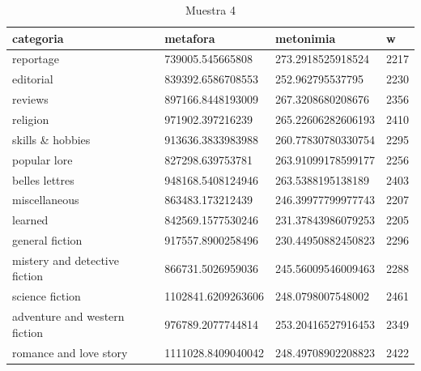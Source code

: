 \documentclass[12pt,letterpaper,twoside]{article}
\begin{document}
\begin{center}
\begin{longtable}{| p{} | p{} | p{}|p{}|}
\caption{Muestra 4}
    \hline
        categoria & metafora & metonimia & w \\ \hline
        reportage & 739005.545665808 & 273.2918525918524 & 2217 \\ \hline
        editorial & 839392.6586708553 & 252.962795537795 & 2230 \\ \hline
        reviews & 897166.8448193009 & 267.3208680208676 & 2356 \\ \hline
        religion & 971902.397216239 & 265.22606282606193 & 2410 \\ \hline
        skills \& hobbies & 913636.3833983988 & 260.77830780330754 & 2295 \\ \hline
        popular lore & 827298.639753781 & 263.91099178599177 & 2256 \\ \hline
        belles lettres & 948168.5408124946 & 263.5388195138189 & 2403 \\ \hline
        miscellaneous & 863483.173212439 & 246.39977799977743 & 2207 \\ \hline
        learned & 842569.1577530246 & 231.37843986079253 & 2205 \\ \hline
        general fiction & 917557.8900258496 & 230.44950882450823 & 2296 \\ \hline
        mistery and detective fiction & 866731.5026959036 & 245.56009546009463 & 2288 \\ \hline
        science fiction & 1102841.6209263606 & 248.0798007548002 & 2461 \\ \hline
        adventure and western fiction & 976789.2077744814 & 253.20416527916453 & 2349 \\ \hline
        romance and love story & 1111028.8409040042 & 248.49708902208823 & 2422 \\ \hline


\end{longtable}
    \label{muestra4}
\end{center}
\end{document}

